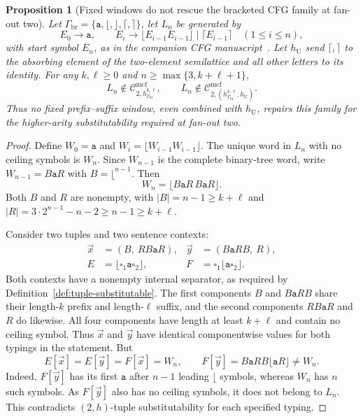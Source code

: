 \documentclass[11pt]{article}
\numberwithin{equation}{section}
\theoremstyle{plain}
\newtheorem{proposition}[theorem]{Proposition}
\theoremstyle{definition}
\theoremstyle{remark}
\newcommand{\Cmcf}[2]{\mathcal{C}^{\mathrm{mcf}}_{#1,#2}}
\newcommand{\tuple}[1]{\vec{#1}}
\newcommand{\blank}{\square}
\theoremstyle{plain}
\begin{document}
\begin{proposition}[Fixed windows do not rescue the bracketed CFG family at fan-out two]
\label{prop:fixed-window-doubling-fanout-two}
Let $\Gamma_{\mathrm{br}}=\{\mathtt a,\lfloor,\rfloor,\lceil,\rceil\}$,
let $L_n$ be generated by
\[
 E_0\to\mathtt a,\qquad
 E_i\to\lfloor E_{i-1}E_{i-1}\rfloor
       \mid\lceil E_{i-1}\rceil\quad(1\le i\le n),
\]
with start symbol $E_n$, as in the companion CFG
manuscript~\cite{kuriyamaCFG}.
Let $h_{\mathrm U}$ send $\lceil,\rceil$ to the absorbing
element of the two-element semilattice and all other letters
to its identity.
For any $k,\ell\ge0$ and
$n\ge\max\{3,k+\ell+1\}$,
\[
 L_n\notin\Cmcf{2}{h_{\Gamma_{\mathrm{br}}}^{k,\ell}},
 \qquad
 L_n\notin\Cmcf{2}{(h_{\Gamma_{\mathrm{br}}}^{k,\ell},h_{\mathrm U})}.
\]
Thus no \emph{fixed} prefix--suffix window, even combined with
$h_{\mathrm U}$, repairs this family for the higher-arity
substitutability required at fan-out two.
\end{proposition}
\begin{proof}
Define $W_0=\mathtt a$ and
$W_i=\lfloor W_{i-1}W_{i-1}\rfloor$.
The unique word in $L_n$ with no ceiling symbols is $W_n$.
Since $W_{n-1}$ is the complete binary-tree word, write
$W_{n-1}=B\mathtt a R$ with
$B=\lfloor^{n-1}$.
Then
\[
 W_n=\lfloor B\mathtt a R\,B\mathtt a R\rfloor.
\]
Both $B$ and $R$ are nonempty, with
$|B|=n-1\ge k+\ell$ and
$|R|=3\cdot2^{n-1}-n-2\ge n-1\ge k+\ell$.

Consider two tuples and two sentence contexts:
\[
 \begin{aligned}
 \tuple x&=(B,\ R B\mathtt a R),&
 \tuple y&=(B\mathtt a R B,\ R),\\
 E&=\lfloor\blank_1\mathtt a\blank_2\rfloor,&
 F&=\blank_1\lfloor\mathtt a\blank_2\rfloor.
 \end{aligned}
\]
Both contexts have a nonempty internal separator, as
required by Definition~\ref{def:tuple-substitutable}.
The first components $B$ and $B\mathtt a R B$ share
their length-$k$ prefix and length-$\ell$ suffix,
and the second components $R B\mathtt a R$ and $R$
do likewise. All four components have length at least
$k+\ell$ and contain no ceiling symbol.
Thus $\tuple x$ and $\tuple y$ have identical
componentwise values for both typings in the statement.
But
\[
 E[\tuple x]=E[\tuple y]=F[\tuple x]=W_n,
 \qquad
 F[\tuple y]=B\mathtt a R B\lfloor\mathtt a R\rfloor
 \ne W_n.
\]
Indeed, $F[\tuple y]$ has its first $\mathtt a$
after $n-1$ leading $\lfloor$ symbols, whereas
$W_n$ has $n$ such symbols.
As $F[\tuple y]$ also has no ceiling symbols,
it does not belong to $L_n$.
This contradicts $(2,h)$-tuple substitutability
for each specified typing.
\end{proof}
\end{document}
